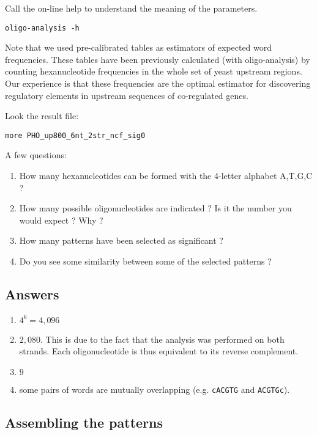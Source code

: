 Call the on-line help to understand the meaning of the parameters.

\begin{verbatim} 
oligo-analysis -h
\end{verbatim}

Note that we used pre-calibrated tables as estimators of expected word
frequencies. These tables have been previously calculated (with
oligo-analysis) by counting hexanucleotide frequencies in the whole
set of yeast upstream regions. Our experience is that these
frequencies are the optimal estimator for discovering regulatory
elements in upstream sequences of co-regulated genes.

Look the result file:

\begin{verbatim}
more PHO_up800_6nt_2str_ncf_sig0
\end{verbatim}

A few questions:
\begin{enumerate}
\item How many hexanucleotides can be formed with the 4-letter alphabet A,T,G,C ?
\item How many possible oligonucleotides are indicated ? Is it the number you would expect ? Why ?
\item How many patterns have been selected as significant ?
\item Do you see some similarity between some of the selected patterns ?
\end{enumerate}

\subsection{Answers}

\begin{enumerate}
\item $4^6=4,096$
\item $2,080$. This is due to the fact that the analysis was performed on
both strands. Each oligonucleotide is thus equivalent to its reverse
complement.
\item $9$
\item some pairs of words are mutually overlapping
  (e.g. \texttt{cACGTG} and \texttt{ACGTGc}).
\end{enumerate}

\subsection{Assembling the patterns}

